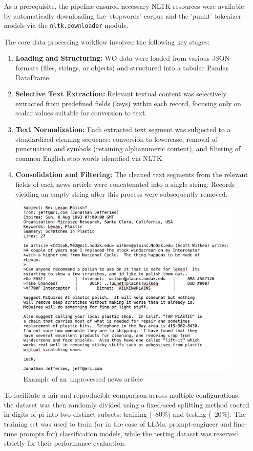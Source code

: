 As a prerequisite, the pipeline ensured necessary NLTK resources were available by automatically downloading the 'stopwords' corpus and the 'punkt' tokenizer models via the \verb|nltk.downloader| module.

The core data processing workflow involved the following key stages:

\begin{enumerate}
    \item \textbf{Loading and Structuring:} WO data were loaded from various JSON formats (files, strings, or objects) and structured into a tabular Pandas DataFrame.
    \item \textbf{Selective Text Extraction:} Relevant textual content was selectively extracted from predefined fields (keys) within each record, focusing only on scalar values suitable for conversion to text.
    \item \textbf{Text Normalization:} Each extracted text segment was subjected to a standardized cleaning sequence: conversion to lowercase, removal of punctuation and symbols (retaining alphanumeric content), and filtering of common English stop words identified via NLTK.
    \item \textbf{Consolidation and Filtering:} The cleaned text segments from the relevant fields of each news article were concatenated into a single string. Records yielding an empty string after this process were subsequently removed.
\end{enumerate}


\begin{figure}[h!]
    \centering
    \includegraphics[width=0.5\linewidth]{images/fig2.png}
    \caption{Example of an unprocessed news article}
    \label{fig:enter-label}
\end{figure}

To facilitate a fair and reproducible comparison across multiple configurations, the dataset was then randomly divided using a fixed-seed splitting method rooted in digits of pi into two distinct subsets: training (~80\%) and testing (~20\%). The training set was used to train (or in the case of LLMs, prompt-engineer and fine-tune prompts for) classification models, while the testing dataset was reserved strictly for their performance evaluation.


